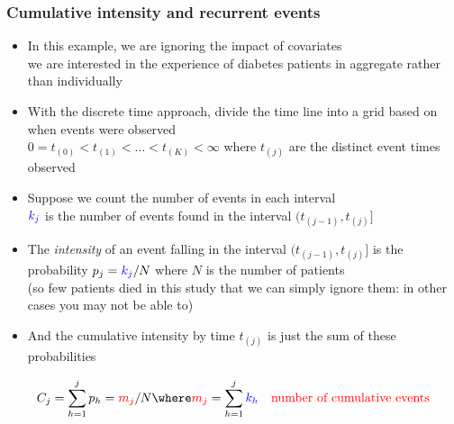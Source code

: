 \documentclass[11pt,pdftex,dvipsnames,usenames,helvetica]{beamer}
\begin{document}
\begin{frame}\frametitle{Cumulative intensity
and recurrent events}

\begin{itemize}
\item In this example, we are ignoring the impact of 
covariates\\ we are interested in the experience
of diabetes patients in aggregate rather than individually
\item With the discrete time approach, divide the time line
into a grid based on when events were observed\\
$0=t_{(0)}<t_{(1)} < \dots < t_{(K)}<\infty$ where
$t_{(j)}$ are the distinct event times observed
\item Suppose we count the number of events in each interval\\
$\textcolor{blue}{k_j}$ is the number of events found in the interval
$(t_{(j-1)}, t_{(j)}]$
\item The {\it intensity} of an event falling in the interval
  $(t_{(j-1)}, t_{(j)}]$ is the probability
$p_j=\textcolor{blue}{k_j}/N$ where $N$ is the number of patients\\
(so few patients died in this study that we can 
simply ignore them: in other cases you may not be able to)
\item And the cumulative intensity by time $t_{(j)}$
is just the sum of these probabilities%
\end{itemize}
\begin{align*}
C_j &= \sum_{h=1}^j p_h = \textcolor{red}{m_j}/N 
\where \textcolor{red}{m_j}=\sum_{h=1}^j \textcolor{blue}{k_h}
& \mbox{\textcolor{red}{number of cumulative events}}
\end{align*}
\end{frame}
 
\end{document}

